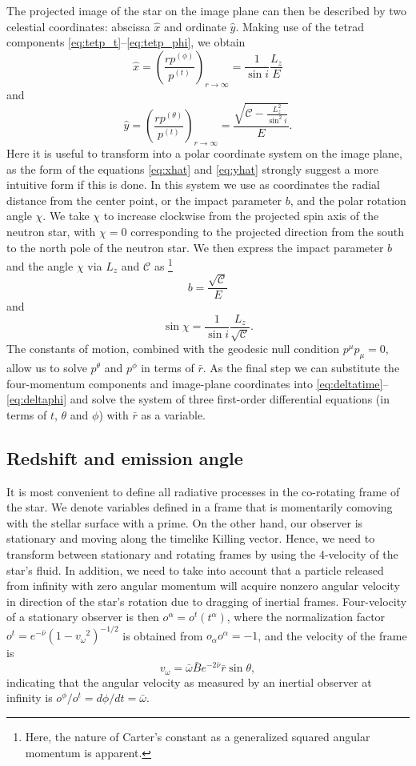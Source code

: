 \documentclass[iop, usenatbib]{emulateapj}
\newcommand{\be}{\begin{equation}}
\newcommand{\ee}{\end{equation}}
\newcommand{\Ca}{\ensuremath{\mathcal{C}}}
\newcommand{\rb}{\ensuremath{\bar{r}}}
\newcommand{\wb}{\ensuremath{\bar{\omega}}}
\newcommand{\nub}{\ensuremath{\bar{\nu}}}
\newcommand{\Bb}{\ensuremath{\bar{B}}}
\newcommand{\vw}{\ensuremath{v_{\omega}}}
\begin{document}
The projected image of the star on the image plane can then be described by two celestial coordinates:
abscissa $\hat{x}$ and ordinate $\hat{y}$.
Making use of the tetrad components \eqref{eq:tetp_t}--\eqref{eq:tetp_phi}, we obtain \citep[][p.347]{cha}
\be\label{eq:xhat}
\hat{x} = \left( \frac{rp^{(\phi)}}{p^{(t)}} \right)_{r \rightarrow \infty} = \frac{1}{\sin i} \frac{L_z}{E}
\ee
and
\be\label{eq:yhat}
\hat{y} = \left( \frac{rp^{(\theta)}}{p^{(t)}} \right)_{r \rightarrow \infty} = \frac{\sqrt{\Ca - \frac{L_z^2}{\sin^2 i}}}{E}.
\ee
Here it is useful to transform into a polar coordinate system on the image plane, as the form of the equations \eqref{eq:xhat} and \eqref{eq:yhat} strongly suggest a more intuitive form if this is done. 
In this system we use as coordinates the radial distance from the center point, or the impact parameter $b$, and the polar rotation angle $\chi$.  
We take $\chi$ to increase clockwise from the projected spin axis of the neutron star, with $\chi=0$ corresponding to the projected direction from the south to the north pole of the neutron star.  
We then express the impact parameter $b$ and the angle $\chi$ via $L_z$ and $\Ca$ as%
\footnote{
    Here, the nature of Carter's constant as a generalized squared
    angular momentum is apparent.
}
\be
b = \frac{\sqrt{\Ca}}{E}
\ee
and
\be
\sin \chi = \frac{1}{\sin i} \frac{L_z}{\sqrt{\Ca}}.
\ee
The constants of motion, combined with the geodesic null condition $p^\mu p_\mu = 0$, allow us to solve $p^\theta$ and $p^\phi$ in terms of $\rb$.
As the final step we can substitute the four-momentum components and image-plane coordinates into \eqref{eq:deltatime}--\eqref{eq:deltaphi} and solve the system of three first-order differential equations (in terms of $t$, $\theta$ and $\phi$) with $\rb$ as a variable.


\subsection{Redshift and emission angle}\label{sect:redshift_angle}
It is most convenient to define all radiative processes in the co-rotating frame of the star.
We denote variables defined in a frame that is momentarily comoving with the stellar surface with a prime.  
On the other hand, our observer is stationary and moving along the timelike Killing vector.  
Hence, we need to transform between stationary and rotating frames by using the 4-velocity of the star's fluid.  
In addition, we need to take into account that a particle released from infinity with zero angular momentum will acquire nonzero angular velocity in direction of the star's rotation due to dragging of inertial frames.
Four-velocity of a stationary observer is then $o^{\alpha} = o^t(t^{\alpha})$, where the normalization factor $o^t = e^{-\nub}(1-\vw^2)^{-1/2}$ is obtained from $o_{\alpha}o^{\alpha} = -1$, and the velocity of the frame is 
\be
\vw = \wb \Bb e^{-2\nub} \rb \sin\theta,
\ee
indicating that the angular velocity as measured by an inertial observer at infinity is $o^{\phi} / o^{t} = d\phi/dt = \wb$.
\end{document}
